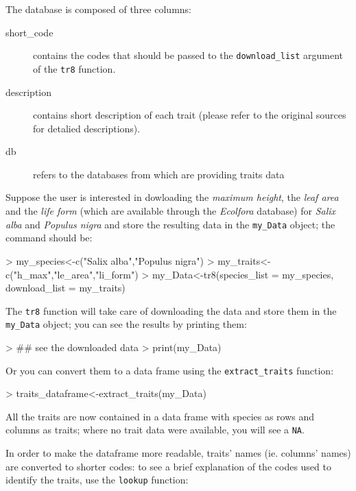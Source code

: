 \documentclass{article}
\begin{document}
 The database is composed of three columns:
 \begin{description}
 \item[short\_code] contains the codes that should be passed to the \texttt{download\_list} argument of the \texttt{tr8} function.
 \item[description] contains short description of each trait (please refer to the original sources for detalied descriptions).
 \item[db] refers to the databases from which are providing traits data
 \end{description}

 Suppose the user is interested in dowloading the \textit{maximum
   height}, the \textit{leaf area} and the \textit{life form} (which
 are available through the \textit{Ecolfora} database) for
 \textit{Salix alba} and \textit{Populus nigra} and store the resulting data in the \texttt{my\_Data} object; the command should be:
 
\begin{Schunk}
\begin{Sinput}
> my_species<-c("Salix alba","Populus nigra")
> my_traits<-c("h_max","le_area","li_form")
> my_Data<-tr8(species_list = my_species, download_list = my_traits)
\end{Sinput}
\end{Schunk}

  The \texttt{tr8} function will take care of downloading the data and
  store them in the \texttt{my\_Data} object; you can see the results
  by printing them:

\begin{Schunk}
\begin{Sinput}
> ## see the downloaded data
> print(my_Data)
\end{Sinput}
\end{Schunk}

  Or you can convert them to a data frame using the \texttt{extract\_traits} function:
  
\begin{Schunk}
\begin{Sinput}
> traits_dataframe<-extract_traits(my_Data)
\end{Sinput}
\end{Schunk}

  All the traits are now contained in a data frame with species as rows
  and columns as traits; where no trait data were available, you will
  see a \texttt{NA}. 

  
  In order to make the dataframe more readable,  traits' names (ie. columns' names) are converted to shorter codes: to see a brief explanation of the codes used to identify the traits, use the \texttt{lookup} function: 
\end{document}
